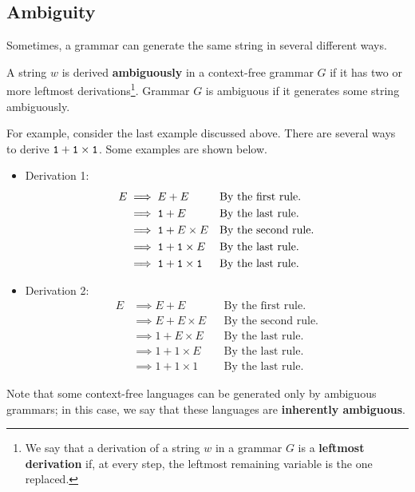 \documentclass[letterpaper]{article}
\begin{document}
\subsection{Ambiguity}
Sometimes, a grammar can generate the same string in several different ways.
\begin{definition}{}{}
    A string $w$ is derived \textbf{ambiguously} in a context-free grammar $G$ if it has two or more leftmost derivations\footnote{We say that a derivation of a string $w$ in a grammar $G$ is a \textbf{leftmost derivation} if, at every step, the leftmost remaining variable is the one replaced.}. Grammar $G$ is ambiguous if it generates some string ambiguously.
\end{definition}
For example, consider the last example discussed above. There are several ways to derive $\texttt{1} + \texttt{1} \times \texttt{1}$. Some examples are shown below. 
\begin{mdframed}[]
    \begin{itemize}
        \item Derivation 1:
        \begin{equation*}
            \begin{aligned}
                E &\implies E + E && \text{By the first rule.} \\ 
                    &\implies \texttt{1} + E && \text{By the last rule.} \\ 
                    &\implies \texttt{1} + E \times E && \text{By the second rule.} \\ 
                    &\implies \texttt{1} + \texttt{1} \times E && \text{By the last rule.} \\ 
                    &\implies \texttt{1} + \texttt{1} \times \texttt{1} && \text{By the last rule.}
            \end{aligned}
        \end{equation*}

        \item Derivation 2: 
        \begin{equation*}
            \begin{aligned}
                E &\implies E + E && \text{By the first rule.} \\ 
                    &\implies E + E \times E && \text{By the second rule.} \\ 
                    &\implies 1 + E \times E && \text{By the last rule.} \\ 
                    &\implies 1 + 1 \times E && \text{By the last rule.} \\ 
                    &\implies 1 + 1 \times 1 && \text{By the last rule.}
            \end{aligned}
        \end{equation*}
    \end{itemize}
\end{mdframed}
Note that some context-free languages can be generated only by ambiguous grammars; in this case, we say that these languages are \textbf{inherently ambiguous}.
\end{document}
